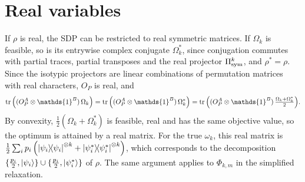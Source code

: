 \documentclass[11pt,a4paper]{report}
\newcommand{\one}{\mathds{1}}
\newcommand{\I}{\one}
\newcounter{reptag}
\newif\iftags \tagsfalse   %
\newcommand{\reptagbox}[3]{\iftags\par\smallskip\noindent\refstepcounter{reptag}%
  \fcolorbox{#1}{#1!7}{\parbox{\dimexpr\linewidth-2\fboxsep-2\fboxrule\relax}{\small
  \textcolor{#1}{\textbf{[\thereptag]\ #2.}}\ #3}}\par\smallskip\fi}
\newcommand{\detail}[1]{\reptagbox{tagD}{More detail}{#1}}
\begin{document}
\section{Real variables}
If $\rho$ is real, the SDP can be restricted to real symmetric matrices. If $\Omega_k$ is feasible, so is its entrywise complex conjugate $\Omega_k^*$, since conjugation commutes with partial traces, partial transposes and the real projector $\Pi_{\rm sym}^k$, and $\rho^*=\rho$. Since the isotypic projectors are linear combinations of permutation matrices with real characters, $O_P$ is real, and
\begin{equation}
    \tr\left((O_P^A \otimes \I^B)\, \Omega_k\right) = \tr\left((O_P^A \otimes \I^B)\, \Omega_k^*\right) = \tr\Big((O_P^A \otimes \I^B)\, \tfrac{\Omega_k + \Omega_k^*}{2}\Big).
\end{equation}
By convexity, $\frac12(\Omega_k+\Omega_k^*)$ is feasible, real and has the same objective value, so the optimum is attained by a real matrix. For the true $\omega_k$, this real matrix is $\frac{1}{2}\sum_i p_i \left(\dyad{\psi_i}^{\otimes k} + \dyad{\psi_i^*}^{\otimes k}\right)$, which corresponds to the decomposition $\{\frac{p_i}{2},\ket{\psi_i}\}\cup\{\frac{p_i}{2},\ket{\psi_i^*}\}$ of $\rho$. The same argument applies to $\Phi_{k,m}$ in the simplified relaxation.
\detail{Add the remark that a real $\rho$ does not imply a real optimal decomposition: the argument only shows that the optimal $\Omega_k$ can be taken real, which corresponds to the symmetrised ensemble with $\ket{\psi_i}$ and $\ket{\psi_i^*}$. Quantify the saving in memory and time on one example.}
\end{document}

